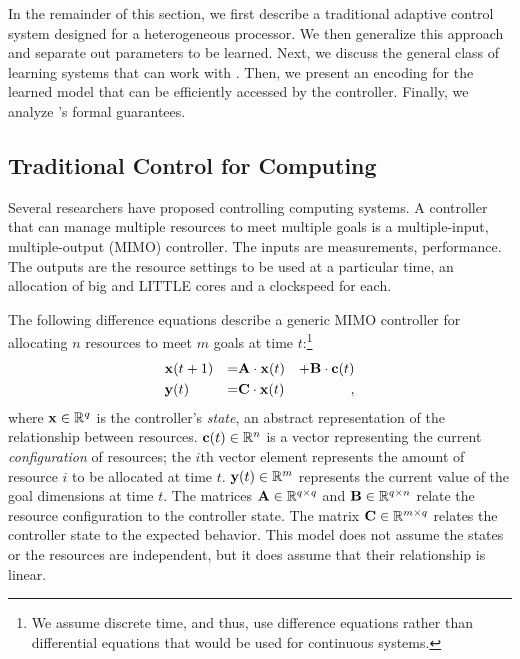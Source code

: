 In the remainder of this section, we first describe a traditional
adaptive control system designed for a heterogeneous processor.  We
then generalize this approach and separate out parameters to be
learned.  Next, we discuss the general class of learning systems that
can work with \SYSTEM{}.  Then, we present an encoding for the learned
model that can be efficiently accessed by the controller.  Finally, we
analyze \SYSTEM{}'s formal guarantees.


\subsection{Traditional Control for Computing}
Several researchers have proposed controlling computing systems.  A
controller that can manage multiple resources to meet multiple goals
is a multiple-input, multiple-output (MIMO) controller.  The inputs
are measurements, \eg{} performance.  The outputs are the resource
settings to be used at a particular time, \eg{} an allocation of big
and LITTLE cores and a clockspeed for each.

The following difference equations describe a generic MIMO controller
for allocating $n$ resources to meet $m$ goals at time
$t$:\footnote{We assume discrete time, and thus, use difference
  equations rather than differential equations that would be used for
  continuous systems.}
\begin{equation}
\begin{aligned}
&\mathbf{x}(t+1) &=& \mathbf{A} \cdot \mathbf{x}(t)& + \mathbf{B} \cdot \mathbf{c}(t)\\
&\mathbf{y}(t)   &=& \mathbf{C} \cdot \mathbf{x}(t)&,
\end{aligned}
\label{eqn:system:mimo}
\end{equation}
where $\mathbf{x} \in \mathbb{R}^{q}$ is the controller's \emph{state}, an abstract
representation of the relationship between resources.  $\mathbf{c}(t)
\in \mathbb{R}^n$ is a vector representing the current \emph{configuration} of
resources; \ie{} the $i$th vector element represents the amount of
resource $i$ to be allocated at time $t$.  $\mathbf{y}(t) \in \mathbb{R}^{m}$
represents the current value of the goal dimensions at time $t$. The
matrices $\mathbf{A} \in \mathbb{R}^{q \times q}$ and $\mathbf{B} \in \mathbb{R}^{q
  \times n}$ relate the resource configuration to the controller
state.  The matrix $\mathbf{C} \in \mathbb{R}^{m \times q}$ relates the
controller state to the expected behavior.  This model does not assume
the states or the resources are independent, but it does assume that
their relationship is linear.

